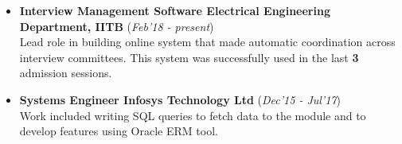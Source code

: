 \documentclass[10pt]{article}
\begin{document}
\colorbox{bl}{}
\vspace{-0.6cm}
\begin{itemize}[leftmargin=0.4cm]
    \item \textbf{Interview Management Software \textpipe \hspace{0.05cm} Electrical Engineering Department, IITB} \hfill{(\textit{Feb'18 - present})}\\
\vspace{-0.1cm}
\hspace{-0.09cm}Lead role in building online system that made automatic coordination across interview committees. This system was successfully used in the last \textbf{3} admission sessions.

\end{itemize}
    \vspace{-0.35cm}

\begin{itemize}[leftmargin=0.4cm]
    \item \textbf{Systems Engineer \textpipe  \hspace{0.05cm} Infosys Technology Ltd} \hfill{(\textit{Dec'15 - Jul'17})}\\
         Work included writing SQL queries to fetch data to the module and to develop features using Oracle ERM tool.
\end{itemize}
\vspace{-0.1cm}
\end{document}
